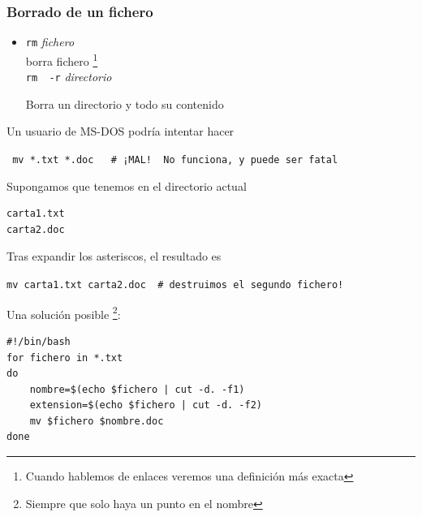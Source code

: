 \documentclass[ucs]{beamer}
\begin{document}

\begin{frame}[fragile]
\frametitle{Borrado de un fichero}
\begin{itemize} 

\item 
\verb|rm| \emph{fichero} \\borra fichero  \footnote{Cuando hablemos de enlaces veremos una definición más exacta} \\
\verb|rm  -r| \emph{directorio} 

Borra un directorio y todo su contenido
%

\end{itemize}
\end{frame}

\begin{frame}[fragile]
Un usuario de MS-DOS podría intentar hacer

\verb| mv *.txt *.doc   # ¡MAL!  No funciona, y puede ser fatal|

Supongamos que tenemos en el directorio actual
\begin{footnotesize}
\begin{verbatim}
carta1.txt 
carta2.doc
\end{verbatim}
\end{footnotesize}
Tras expandir los asteriscos, el resultado es

\verb|mv carta1.txt carta2.doc  # destruimos el segundo fichero!|


Una solución posible \footnote{Siempre que solo haya un punto en el nombre}:
\begin{footnotesize}
\begin{verbatim}
#!/bin/bash
for fichero in *.txt
do
    nombre=$(echo $fichero | cut -d. -f1)
    extension=$(echo $fichero | cut -d. -f2)
    mv $fichero $nombre.doc
done
\end{verbatim}
\end{footnotesize}



\end{frame}



\end{document}
